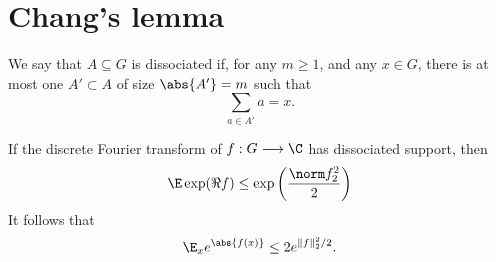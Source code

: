 \chapter{Chang's lemma}

\begin{definition}[Dissociation]
\label{dissociated}
\leanok
We say that $A\subseteq G$ is dissociated if, for any $m\geq 1$, and any $x\in G$, there is at most one $A'\subset A$ of size $\abs{A'}=m$ such that
\[\sum_{a\in A'}a=x.\]
\end{definition}


\begin{lemma}
\label{rudin_exp}
\leanok
If the discrete Fourier transform of $f : G \longrightarrow \C$ has dissociated support, then
$$\E \exp(\Re f) \le \exp\left(\frac{\norm f_2^2} 2\right)$$
It follows that
\[\E_x e^{\abs{f(x)}} \le 2e^{\| f\|_2^2/2}.\]
\end{lemma}
